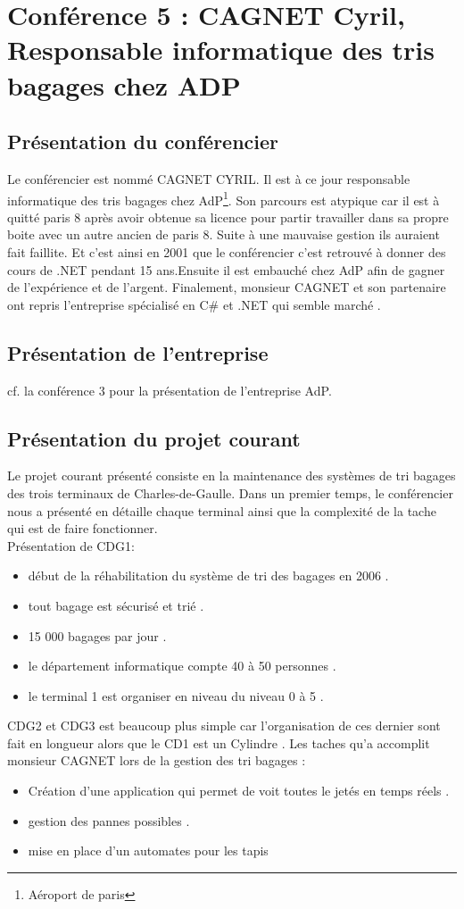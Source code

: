 \section{Conférence 5 : CAGNET Cyril, Responsable informatique des tris bagages chez ADP}
 	\subsection{Présentation du conférencier}
 		Le conférencier est  nommé CAGNET CYRIL. Il est à ce jour responsable informatique des tris bagages chez AdP\footnote{Aéroport de paris}. Son parcours est atypique car il est à quitté paris 8 après avoir obtenue sa licence pour partir travailler dans sa propre boite avec un autre ancien de paris 8. Suite à une mauvaise gestion ils auraient fait faillite. Et c'est ainsi en 2001 que le conférencier c'est retrouvé à donner des cours de .NET pendant 15 ans.Ensuite il est embauché chez AdP afin de gagner de l'expérience et de l'argent. Finalement, monsieur CAGNET et son partenaire ont repris l'entreprise spécialisé en C\# et .NET qui semble marché . 
 	\subsection{Présentation de l'entreprise}
 		cf. la conférence 3 pour la présentation de l'entreprise AdP. 
 	\subsection{Présentation du projet courant}
 		Le projet courant présenté consiste en la maintenance des  systèmes de tri bagages des trois terminaux de Charles-de-Gaulle. Dans un premier temps, le conférencier nous a présenté en détaille chaque terminal ainsi que la complexité de la tache qui est de faire fonctionner. \\
 		Présentation de CDG1:
 		\begin{itemize}
 			\item début de la réhabilitation du système de tri des bagages en 2006 . 
 			\item tout bagage est sécurisé et trié .
 			\item 15 000 bagages par jour .
 			\item le département informatique compte 40 à 50 personnes .
 			\item le terminal 1 est organiser en niveau du niveau 0 à 5 .
 		\end{itemize}
 		CDG2 et CDG3 est beaucoup plus simple car l'organisation de ces dernier sont fait en longueur alors que le CD1 est un Cylindre .
 		Les taches qu'a accomplit monsieur CAGNET lors de la gestion des tri bagages :
 		\begin{itemize}
 		 	\item Création d'une application qui permet de voit toutes le jetés en temps réels .
 		 	\item gestion des pannes possibles .
 		 	\item mise en place d'un automates pour les tapis 
 		 \end{itemize} 

